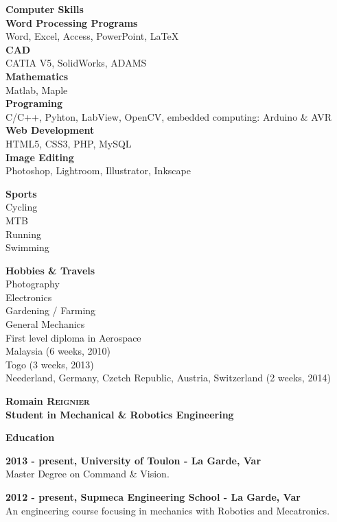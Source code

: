 \documentclass[a4paper,12pt,final]{memoir}
\newcommand{\Sep}{\vspace{1.5em}}
\newcommand{\SmallSep}{\vspace{0.5em}}
\newenvironment{AboutMe}
	{\ignorespaces\textbf{\color{RoyalBlue} About me}}
	{\Sep\ignorespacesafterend}
\newcommand{\CVSection}[1]
	{\Large\textbf{#1}\par
	\SmallSep\normalsize\normalfont}
\newcommand{\CVItem}[2]
	{\textbf{\color{RoyalBlue} #1 - {\small\color{black}#2}}\normalsize\normalfont}
\newcommand{\SkillSection}[1]
	{\small{\textbf{#1\\}}\normalfont\footnotesize}
\newcommand{\SkillItem}[1]
	{\textbf{\color{RoyalBlue} #1}\normalfont\\}
\begin{document}
\SkillSection{Computer Skills}
\SkillItem{Word Processing Programs}
Word, Excel, Access, PowerPoint, LaTeX\\
\SkillItem{CAD}
CATIA V5, SolidWorks, ADAMS\\
\SkillItem{Mathematics}
Matlab, Maple\\
\SkillItem{Programing}
C/C++, Pyhton, LabView, OpenCV, embedded computing: Arduino \& AVR\\
\SkillItem{Web Development}
HTML5, CSS3, PHP, MySQL\\
\SkillItem{Image Editing}
Photoshop, Lightroom, Illustrator, Inkscape
\SmallSep

\SkillSection{Sports}
Cycling\\
MTB\\
Running\\
Swimming
\SmallSep

\SkillSection{Hobbies \& Travels}
Photography\\
Electronics\\
Gardening / Farming\\
General Mechanics\\
First level diploma in Aerospace\\

Malaysia (6 weeks, 2010)\\
Togo (3 weeks, 2013)\\
Neederland, Germany, Czetch Republic, Austria, Switzerland (2 weeks, 2014)

\framebreak


\Huge\bfseries {\color{RoyalBlue} Romain \textsc{Reignier}} \\
\Large\bfseries  Student in Mechanical \& Robotics Engineering \\

\normalsize\normalfont


\CVSection{Education}

\CVItem{2013 - present, University of Toulon}{La Garde, Var}\\
Master Degree on Command \& Vision.
\SmallSep

\CVItem{2012 - present, Supmeca Engineering School}{La Garde, Var}\\
An engineering course focusing in mechanics with Robotics and Mecatronics.
\SmallSep
\end{document}
